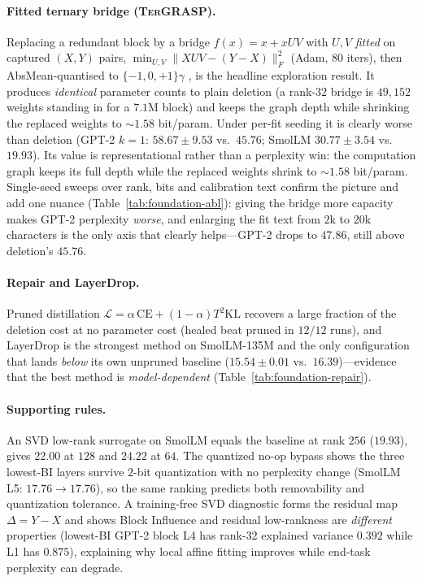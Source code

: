 \documentclass[10pt,a4paper]{article}
\newcommand{\ce}{\mathrm{CE}}
\newcommand{\term}{\textsc{TerGRASP}}
\begin{document}
\paragraph{Fitted ternary bridge (\term{}).} Replacing a redundant block by a
bridge $f(x)=x+xUV$ with $U,V$ \emph{fitted} on captured $(X,Y)$ pairs,
$\min_{U,V}\lVert XUV-(Y-X)\rVert_F^2$ (Adam, $80$ iters), then AbsMean-quantised
to $\{-1,0,+1\}\gamma$ \citep{ma2024bitnet}, is the headline exploration result.
It produces \emph{identical} parameter counts to plain deletion (a rank-$32$
bridge is $49{,}152$ weights standing in for a $7.1$M block) and keeps the graph
depth while shrinking the replaced weights to ${\sim}1.58$ bit/param. Under
per-fit seeding it is clearly worse than deletion (GPT-2 $k{=}1$:
$58.67\pm9.53$ vs.\ $45.76$; SmolLM $30.77\pm3.54$ vs.\ $19.93$). Its value is
representational rather than a perplexity win: the computation graph keeps its
full depth while the replaced weights shrink to ${\sim}1.58$ bit/param.
Single-seed sweeps over rank, bits and
calibration text confirm the picture and add one nuance
(Table~\ref{tab:foundation-abl}): giving the bridge more capacity makes GPT-2
perplexity \emph{worse}, and enlarging the fit text from $2$k to $20$k
characters is the only axis that clearly helps---GPT-2 drops to $47.86$, still
above deletion's $45.76$.

\paragraph{Repair and LayerDrop.} Pruned distillation
$\mathcal{L}=\alpha\,\ce + (1-\alpha)T^2\mathrm{KL}$ \citep{ma2023llmpruner}
recovers a large fraction of the deletion cost at no parameter cost (healed beat
pruned in $12/12$ runs), and LayerDrop \citep{fan2020layerdrop} is the strongest
method on SmolLM-135M and the only configuration that lands \emph{below} its own
unpruned baseline ($15.54\pm0.01$ vs.\ $16.39$)---evidence that the best method
is \emph{model-dependent} (Table~\ref{tab:foundation-repair}).

\paragraph{Supporting rules.} An SVD low-rank surrogate on SmolLM equals the
baseline at rank $256$ ($19.93$), gives $22.00$ at $128$ and $24.22$ at $64$. The
quantized no-op bypass shows the three lowest-BI layers survive $2$-bit
quantization with no perplexity change (SmolLM L5: $17.76\!\to\!17.76$), so the
same ranking predicts both removability and quantization tolerance. A
training-free SVD diagnostic forms the residual map $\Delta=Y-X$ and shows Block
Influence and residual low-rankness are \emph{different} properties (lowest-BI
GPT-2 block L4 has rank-$32$ explained variance $0.392$ while L1 has $0.875$),
explaining why local affine fitting improves while end-task perplexity can
degrade.
\end{document}
